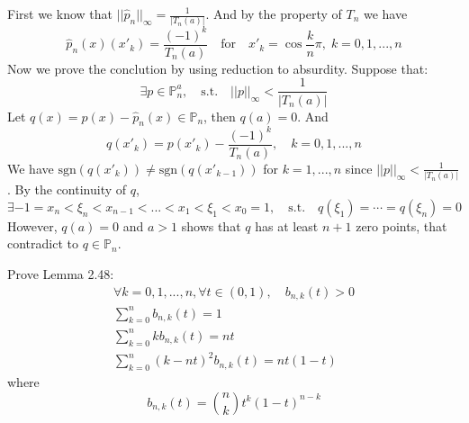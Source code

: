\documentclass[11pt]{elegantbook}
\begin{document}
\begin{solution}
  First we know that $||\hat{p}_n||_\infty=\frac{1}{|T_n(a)|}$. And by the property of $T_n$ we have
  \begin{equation*}
    \hat{p}_n(x)(x'_k) = \frac{(-1)^k}{T_n(a)} \quad \text{for} \quad x'_k=\cos\frac{k}{n}\pi,\;k=0,1,...,n
  \end{equation*}
  Now we prove the conclution by using reduction to absurdity. Suppose that:
  \begin{equation*}
    \exists p\in \mathbb{P}_n^a,\quad \text{s.t.} \quad ||p||_\infty<\frac{1}{|T_n(a)|}
  \end{equation*}
  Let $q(x)=p(x)-\hat{p}_n(x)\in \mathbb{P}_n$, then $q(a)=0$. And
  \begin{equation*}
    q(x'_k) = p(x'_k) - \frac{(-1)^k}{T_n(a)},\quad k=0,1,...,n
  \end{equation*}
  We have $\text{sgn}(q(x'_k))\neq \text{sgn}(q(x'_{k-1}))$ for $k=1,...,n$ since $||p||_\infty<\frac{1}{|T_n(a)|}$. By the continuity of $q$,
  \begin{equation*}
    \exists -1=x_n<\xi_n<x_{n-1}<...<x_{1}<\xi_1<x_0=1, \quad \text{s.t.} \quad q(\xi_1)=\cdots =q(\xi_n)=0
  \end{equation*}
  However, $q(a)=0$ and $a>1$ shows that $q$ has at least $n+1$ zero points, that contradict to $q\in\mathbb{P}_n$.
\end{solution}

\vspace{1.5em}

\begin{problem}
  Prove Lemma 2.48:
  \begin{align}
    \forall k=0,1,...,n, \forall t\in(0,1),\quad b_{n,k}(t)>0 \\
    \sum_{k=0}^n b_{n,k}(t)=1\\
    \sum_{k=0}^n kb_{n,k}(t) = nt\\
    \sum_{k=0}^n (k-nt)^2b_{n,k}(t)=nt(1-t)
  \end{align}
  where
  \begin{equation*}
    b_{n,k}(t) = \binom{n}{k}t^k(1-t)^{n-k}
  \end{equation*}
\end{problem}
\end{document}
